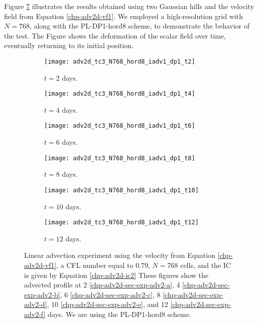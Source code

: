 Figure \ref{chp-adv2d-sec-exp-adv2} illustrates the results obtained using two Gaussian hills and the velocity field 
from Equation \eqref{chp-adv2d-vf1}.
We employed a high-resolution grid with $N=768$, along with the PL-DP1-hord8 scheme,
to demonstrate the behavior of the test.
The Figure shows the deformation of the scalar field over time, eventually returning to its initial position.

\begin{figure}[!htb]
	\centering
	\begin{subfigure}{0.25\textwidth}
		\centering
		\texttt{[image: adv2d\_tc3\_N768\_hord8\_iadv1\_dp1\_t2]}
		\caption{$t=2$ days.\label{chp-adv2d-sec-exp-adv2-a}}
	\end{subfigure}
	\begin{subfigure}{0.25\textwidth}
		\centering
		\texttt{[image: adv2d\_tc3\_N768\_hord8\_iadv1\_dp1\_t4]}
		\caption{$t=4$ days.\label{chp-adv2d-sec-exp-adv2-b}}
	\end{subfigure}
	\begin{subfigure}{0.25\textwidth}
		\centering
		\texttt{[image: adv2d\_tc3\_N768\_hord8\_iadv1\_dp1\_t6]}
		\caption{$t=6$ days.\label{chp-adv2d-sec-exp-adv2-c}}
	\end{subfigure}
	
	\begin{subfigure}{0.25\textwidth}
		\centering
		\texttt{[image: adv2d\_tc3\_N768\_hord8\_iadv1\_dp1\_t8]}
		\caption{$t=8$ days.\label{chp-adv2d-sec-exp-adv2-d}}
	\end{subfigure}
	\begin{subfigure}{0.25\textwidth}
		\centering
		\texttt{[image: adv2d\_tc3\_N768\_hord8\_iadv1\_dp1\_t10]}
		\caption{$t=10$ days.\label{chp-adv2d-sec-exp-adv2-e}}
	\end{subfigure}
	\begin{subfigure}{0.25\textwidth}
		\centering
		\texttt{[image: adv2d\_tc3\_N768\_hord8\_iadv1\_dp1\_t12]}
		\caption{$t=12$ days.\label{chp-adv2d-sec-exp-adv2-f}}
	\end{subfigure}
	\caption{Linear advection experiment using the velocity from Equation \eqref{chp-adv2d-vf1},
		a CFL number equal to $0.79$, $N=768$ cells, and the IC is given by 
		Equation \eqref{chp-adv2d-ic2}
		These figures show the advected profile at
		2 \eqref{chp-adv2d-sec-exp-adv2-a}, 
		4  \eqref{chp-adv2d-sec-exp-adv2-b},
		6  \eqref{chp-adv2d-sec-exp-adv2-c},
		8  \eqref{chp-adv2d-sec-exp-adv2-d},
		10  \eqref{chp-adv2d-sec-exp-adv2-e},
		and 12  \eqref{chp-adv2d-sec-exp-adv2-f} days.
		We are using the PL-DP1-hord8 scheme. \label{chp-adv2d-sec-exp-adv2}}
\end{figure}



